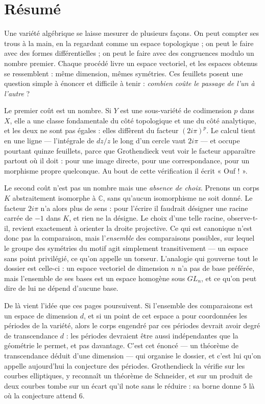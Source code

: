 \documentclass[11pt,a4paper]{article}
\begin{document}
\section*{Résumé}

\begin{resume}
Une variété algébrique se laisse mesurer de plusieurs façons. On peut compter
ses trous à la main, en la regardant comme un espace topologique ; on peut le
faire avec des formes différentielles ; on peut le faire avec des congruences
modulo un nombre premier. Chaque procédé livre un espace vectoriel, et les
espaces obtenus se ressemblent : même dimension, mêmes symétries. Ces feuillets
posent une question simple à énoncer et difficile à tenir : \emph{combien coûte
le passage de l'un à l'autre} ?

Le premier coût est un nombre. Si $Y$ est une sous-variété de codimension $p$
dans $X$, elle a une classe fondamentale du côté topologique et une du côté
analytique, et les deux ne sont pas égales : elles diffèrent du facteur
$(2i\pi)^{p}$. Le calcul tient en une ligne — l'intégrale de $dz/z$ le long
d'un cercle vaut $2i\pi$ — et occupe pourtant quinze feuillets, parce que
Grothendieck veut voir le facteur apparaître partout où il doit : pour une
image directe, pour une correspondance, pour un morphisme propre quelconque. Au
bout de cette vérification il écrit « Ouf ! ».

Le second coût n'est pas un nombre mais une \emph{absence de choix}. Prenons un
corps $K$ abstraitement isomorphe à $\mathbb{C}$, sans qu'aucun isomorphisme ne
soit donné. Le facteur $2i\pi$ n'a alors plus de sens : pour l'écrire il
faudrait désigner une racine carrée de $-1$ dans $K$, et rien ne la désigne. Le
choix d'une telle racine, observe-t-il, revient exactement à orienter la droite
projective. Ce qui est canonique n'est donc pas la comparaison, mais
l'\emph{ensemble} des comparaisons possibles, sur lequel le groupe des symétries
du motif agit simplement transitivement — un espace sans point privilégié, ce
qu'on appelle un torseur. L'analogie qui gouverne tout le dossier est celle-ci :
un espace vectoriel de dimension $n$ n'a pas de base préférée, mais l'ensemble
de ses bases est un espace homogène sous $GL_{n}$, et ce qu'on peut dire de lui
ne dépend d'aucune base.

De là vient l'idée que ces pages poursuivent. Si l'ensemble des comparaisons est
un espace de dimension $d$, et si un point de cet espace a pour coordonnées les
périodes de la variété, alors le corps engendré par ces périodes devrait avoir
degré de transcendance $d$ : les périodes devraient être aussi indépendantes que
la géométrie le permet, et pas davantage. C'est cet énoncé — un théorème de
transcendance déduit d'une dimension — qui organise le dossier, et c'est lui
qu'on appelle aujourd'hui la conjecture des périodes. Grothendieck la vérifie
sur les courbes elliptiques, y reconnaît un théorème de Schneider, et sur un
produit de deux courbes tombe sur un écart qu'il note sans le réduire : sa
borne donne $5$ là où la conjecture attend $6$.


\end{resume}
\end{document}
